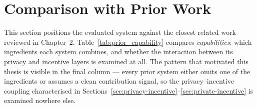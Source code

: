 \FloatBarrier

\section{Comparison with Prior Work}
\label{sec:prior-comparison}

This section positions the evaluated system against the closest related work reviewed in Chapter~2. Table~\ref{tab:prior_capability} compares \emph{capabilities}: which ingredients each system combines, and whether the interaction between its privacy and incentive layers is examined at all. The pattern that motivated this thesis is visible in the final column --- every prior system either omits one of the ingredients or assumes a clean contribution signal, so the privacy--incentive coupling characterised in Sections~\ref{sec:privacy-incentive}--\ref{sec:private-incentive} is examined nowhere else.

